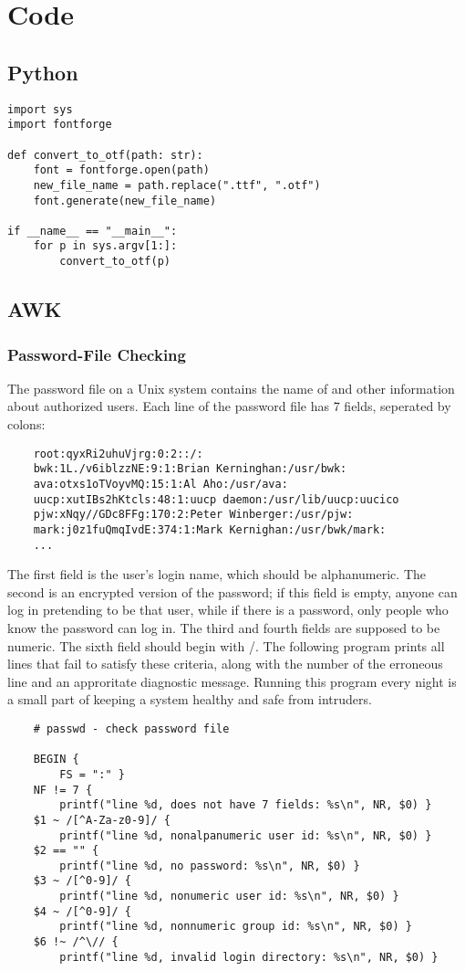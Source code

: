 \section{Code}
\subsection{Python}
\begin{verbatim}
import sys
import fontforge

def convert_to_otf(path: str):
    font = fontforge.open(path)
    new_file_name = path.replace(".ttf", ".otf")
    font.generate(new_file_name)

if __name__ == "__main__":
    for p in sys.argv[1:]:
        convert_to_otf(p)
\end{verbatim}

\subsection{AWK}
\subsubsection{Password-File Checking}
The password file on a Unix system contains the name of and other information
about authorized users. Each line of the password file has 7 fields, seperated
by colons:
\begin{verbatim}
    root:qyxRi2uhuVjrg:0:2::/:
    bwk:1L./v6iblzzNE:9:1:Brian Kerninghan:/usr/bwk:
    ava:otxs1oTVoyvMQ:15:1:Al Aho:/usr/ava:
    uucp:xutIBs2hKtcls:48:1:uucp daemon:/usr/lib/uucp:uucico
    pjw:xNqy//GDc8FFg:170:2:Peter Winberger:/usr/pjw:
    mark:j0z1fuQmqIvdE:374:1:Mark Kernighan:/usr/bwk/mark:
    ...
\end{verbatim}
The first field is the user's login name, which should be alphanumeric. The
second is an encrypted version of the password; if this field is empty, anyone
can log in pretending to be that user, while if there is a password, only
people who know the password can log in. The third and fourth fields are
supposed to be numeric. The sixth field should begin with /. The following
program prints all lines that fail to satisfy these criteria, along with the
number of the erroneous line and an approritate diagnostic message. Running
this program every night is a small part of keeping a system healthy and safe
from intruders.

\begin{verbatim}
    # passwd - check password file

    BEGIN {
        FS = ":" }
    NF != 7 {
        printf("line %d, does not have 7 fields: %s\n", NR, $0) }
    $1 ~ /[^A-Za-z0-9]/ {
        printf("line %d, nonalpanumeric user id: %s\n", NR, $0) }
    $2 == "" {
        printf("line %d, no password: %s\n", NR, $0) }
    $3 ~ /[^0-9]/ {
        printf("line %d, nonumeric user id: %s\n", NR, $0) }
    $4 ~ /[^0-9]/ {
        printf("line %d, nonnumeric group id: %s\n", NR, $0) }
    $6 !~ /^\// {
        printf("line %d, invalid login directory: %s\n", NR, $0) }
\end{verbatim}


